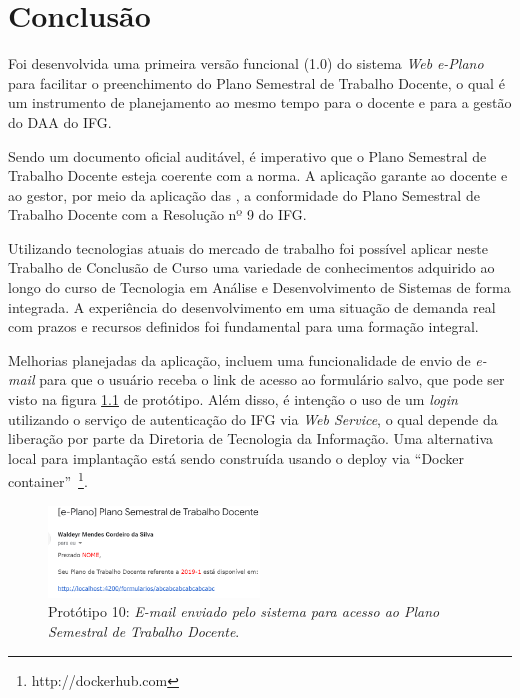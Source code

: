 \chapter{Conclusão}
\label{Conclusao}


Foi desenvolvida uma primeira versão funcional (1.0) do sistema \textit{Web} \textit{e-Plano} para facilitar o preenchimento do Plano Semestral de Trabalho Docente, o qual é um instrumento de planejamento ao mesmo tempo para o docente e para a gestão do \acf{DAA} do \ac{IFG}.

Sendo um documento oficial auditável, é imperativo que o Plano Semestral de Trabalho Docente esteja coerente com a norma.
A aplicação garante ao docente e ao gestor, por meio da aplicação das , a conformidade do Plano Semestral de Trabalho Docente com a Resolução nº 9 do \ac{IFG}.

Utilizando tecnologias atuais do mercado de trabalho foi possível aplicar neste Trabalho de Conclusão de Curso uma variedade de conhecimentos adquirido ao longo do curso de Tecnologia em Análise e Desenvolvimento de Sistemas de forma integrada.
A experiência do desenvolvimento em uma situação de demanda real com prazos e recursos definidos foi fundamental para uma formação integral.

Melhorias planejadas da aplicação, incluem uma funcionalidade de envio de \textit{e-mail} para que o usuário receba o link de acesso ao formulário salvo, que pode ser visto na figura \ref{fig:prot10} de protótipo.
Além disso, é intenção o uso de um \textit{login} utilizando o serviço de autenticação do IFG via \textit{Web Service}, o qual depende da liberação por parte da Diretoria de Tecnologia da Informação.
Uma alternativa local para implantação está sendo construída usando o deploy via ``Docker container''~\footnote{http://dockerhub.com}.

\begin{figure}[htb]
    \centering
    \includegraphics[width=0.5\textwidth]{img/email.PNG}
    \caption[Protótipo 10: \textit{E-mail}]{Protótipo 10: \textit{E-mail enviado pelo sistema para acesso ao Plano Semestral de Trabalho Docente}.}
    \label{fig:prot10}
\end{figure}
